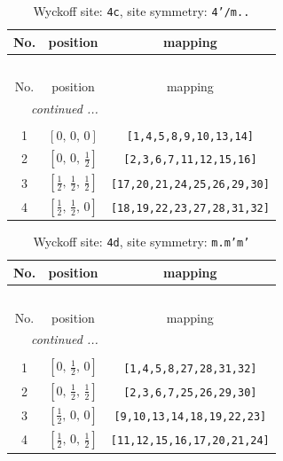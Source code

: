 \documentclass[fleqn,8pt]{jsarticle}
\begin{document}
\renewcommand{\arraystretch}{1.2}
\begin{longtable}{ccc}
\caption{Wyckoff site: {\tt 4c}, site symmetry: {\tt 4'/m..}}
 \\
 \hline \hline
No. & position & mapping \\ \hline \endfirsthead

\multicolumn{2}{l}{\tablename\ \thetable{}} \\
 \hline \hline
No. & position & mapping \\ \hline \endhead

 \hline \hline
\multicolumn{2}{r}{\footnotesize\it continued ...} \\ \endfoot

 \hline \hline
\multicolumn{2}{r}{} \\ \endlastfoot

1 & $\left[ 0,\, 0,\, 0 \right]$ & {\tt [1,4,5,8,9,10,13,14]} \\ \hline
2 & $\left[ 0,\, 0,\, \frac{1}{2} \right]$ & {\tt [2,3,6,7,11,12,15,16]} \\ \hline
3 & $\left[ \frac{1}{2},\, \frac{1}{2},\, \frac{1}{2} \right]$ & {\tt [17,20,21,24,25,26,29,30]} \\ \hline
4 & $\left[ \frac{1}{2},\, \frac{1}{2},\, 0 \right]$ & {\tt [18,19,22,23,27,28,31,32]} \\
\end{longtable}
\renewcommand{\arraystretch}{1.2}
\begin{longtable}{ccc}
\caption{Wyckoff site: {\tt 4d}, site symmetry: {\tt m.m'm'}}
 \\
 \hline \hline
No. & position & mapping \\ \hline \endfirsthead

\multicolumn{2}{l}{\tablename\ \thetable{}} \\
 \hline \hline
No. & position & mapping \\ \hline \endhead

 \hline \hline
\multicolumn{2}{r}{\footnotesize\it continued ...} \\ \endfoot

 \hline \hline
\multicolumn{2}{r}{} \\ \endlastfoot

1 & $\left[ 0,\, \frac{1}{2},\, 0 \right]$ & {\tt [1,4,5,8,27,28,31,32]} \\ \hline
2 & $\left[ 0,\, \frac{1}{2},\, \frac{1}{2} \right]$ & {\tt [2,3,6,7,25,26,29,30]} \\ \hline
3 & $\left[ \frac{1}{2},\, 0,\, 0 \right]$ & {\tt [9,10,13,14,18,19,22,23]} \\ \hline
4 & $\left[ \frac{1}{2},\, 0,\, \frac{1}{2} \right]$ & {\tt [11,12,15,16,17,20,21,24]} \\
\end{longtable}
\end{document}
